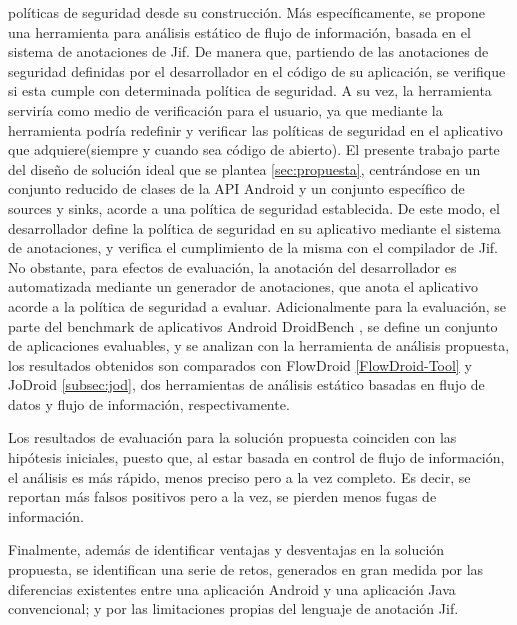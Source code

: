 políticas de seguridad desde su construcción.
Más específicamente, se propone una herramienta para análisis estático de flujo
de información, basada en el sistema de anotaciones de Jif.
De manera que, partiendo de las anotaciones de seguridad definidas por el
desarrollador en el código de su aplicación, se verifique si esta cumple 
con determinada política de seguridad.\newline
A su vez, la herramienta serviría como medio de verificación para el usuario, ya
que mediante la herramienta podría redefinir y verificar las políticas de
seguridad en el aplicativo que adquiere(siempre y cuando sea código de
abierto).\newline
El presente trabajo parte del diseño de solución ideal que se plantea
\ref{sec:propuesta}, centrándose en un conjunto reducido de clases de la API
Android y un conjunto específico de sources y sinks, acorde a una política de
seguridad establecida.\newline 
De este modo, el desarrollador define la política de seguridad en su
aplicativo mediante el sistema de anotaciones, y verifica el cumplimiento de la
misma con el compilador de Jif.\newline  
No obstante, para efectos de evaluación, la anotación del desarrollador es
automatizada mediante un generador de anotaciones, que anota el aplicativo
acorde a la política de seguridad a evaluar.\newline
Adicionalmente para la evaluación, se parte del benchmark de aplicativos Android
DroidBench \cite{DroidBenchBenchmarks}, se define un conjunto de aplicaciones
evaluables, y se analizan con la herramienta de análisis propuesta, los
resultados obtenidos son comparados con FlowDroid \ref{FlowDroid-Tool} y
JoDroid \ref{subsec:jod}, dos herramientas de análisis estático basadas en
flujo de datos y flujo de información, respectivamente.

Los resultados de evaluación para la solución propuesta coinciden con las
hipótesis iniciales, puesto que, al estar basada en control de flujo de
información, el análisis es más rápido, menos preciso pero a la vez completo. Es
decir, se reportan más falsos positivos pero a la vez, se pierden menos fugas de
información.

Finalmente, además de identificar ventajas y desventajas en la solución
propuesta, se identifican una serie de retos, generados en gran medida por las
diferencias existentes entre una aplicación Android y una aplicación Java
convencional; y por las limitaciones propias del lenguaje de anotación Jif.

























